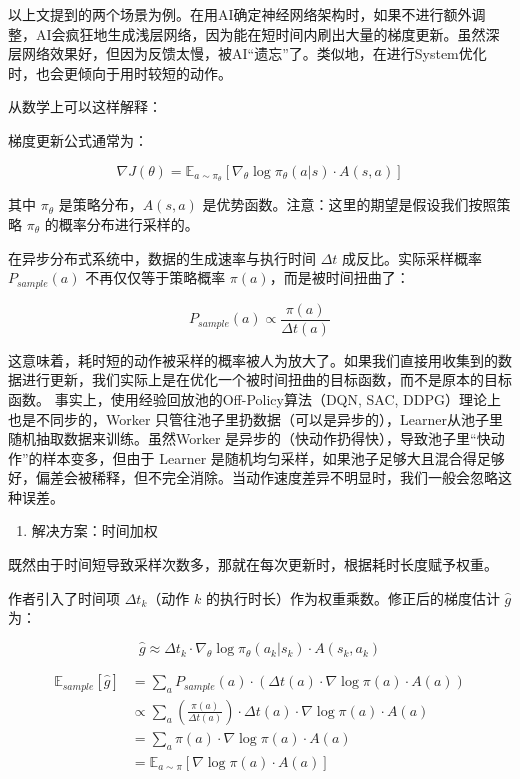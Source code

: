 以上文提到的两个场景为例。在用AI确定神经网络架构时，如果不进行额外调整，AI会疯狂地生成浅层网络，因为能在短时间内刷出大量的梯度更新。虽然深层网络效果好，但因为反馈太慢，被AI``遗忘''了。类似地，在进行System优化时，也会更倾向于用时较短的动作。

从数学上可以这样解释：

梯度更新公式通常为：

\[
\nabla J(\theta)=\mathbb{E}_{a\sim\pi_\theta}\left[\nabla_\theta\log\pi_\theta(a|s)\cdot A(s,a)\right]
\]

其中 \(\pi_\theta\) 是策略分布，\(A(s,a)\) 是优势函数。注意：这里的期望是假设我们按照策略 \(\pi_\theta\) 的概率分布进行采样的。

在异步分布式系统中，数据的生成速率与执行时间 \(\Delta t\) 成反比。实际采样概率 \(P_{sample}(a)\) 不再仅仅等于策略概率 \(\pi(a)\)，而是被时间扭曲了：

\[
P_{sample}(a)\propto \frac{\pi(a)}{\Delta t(a)}
\]

这意味着，耗时短的动作被采样的概率被人为放大了。如果我们直接用收集到的数据进行更新，我们实际上是在优化一个被时间扭曲的目标函数，而不是原本的目标函数。
事实上，使用经验回放池的Off-Policy算法（DQN, SAC, DDPG）理论上也是不同步的，Worker 只管往池子里扔数据（可以是异步的），Learner从池子里随机抽取数据来训练。虽然Worker 是异步的（快动作扔得快），导致池子里``快动作''的样本变多，但由于 Learner 是随机均匀采样，如果池子足够大且混合得足够好，偏差会被稀释，但不完全消除。当动作速度差异不明显时，我们一般会忽略这种误差。

\begin{enumerate}
\def\labelenumi{\arabic{enumi}.}
\setcounter{enumi}{1}
\tightlist
\item
  解决方案：时间加权
\end{enumerate}

既然由于时间短导致采样次数多，那就在每次更新时，根据耗时长度赋予权重。

作者引入了时间项 \(\Delta t_k\)（动作 \(k\) 的执行时长）作为权重乘数。修正后的梯度估计 \(\hat{g}\) 为：

\[
\hat{g}\approx \Delta t_k\cdot \nabla_\theta\log\pi_\theta(a_k|s_k)\cdot A(s_k,a_k)
\]

\[
\begin{aligned}
\mathbb{E}_{sample}[\hat{g}]
&= \sum_a P_{sample}(a)\cdot\left(\Delta t(a)\cdot\nabla\log\pi(a)\cdot A(a)\right)\\
&\propto \sum_a \left(\frac{\pi(a)}{\Delta t(a)}\right)\cdot\Delta t(a)\cdot\nabla\log\pi(a)\cdot A(a)\\
&= \sum_a \pi(a)\cdot\nabla\log\pi(a)\cdot A(a)\\
&= \mathbb{E}_{a\sim\pi}\left[\nabla\log\pi(a)\cdot A(a)\right]
\end{aligned}
\]

